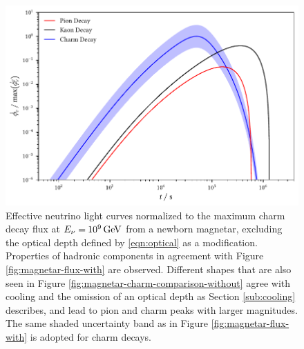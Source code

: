\begin{figure}[H]
	\centering
	\includegraphics{../plots/build/magnetar_neutrino_spectrum_without.pdf}
	\caption[Magnetar $\nu \kern+0.5pt$ flux compared to $c$ decay without optical depth.]
			{Effective neutrino light curves normalized to the maximum charm decay flux at
			 $E_\nu = \kern-0.5pt \qty{e9}{\giga\electronvolt}$ from a newborn magnetar, excluding the optical depth
			 defined by \eqref{eqn:optical} as a modification. Properties of hadronic components in agreement with
			 Figure \ref{fig:magnetar-flux-with} are observed. Different shapes that are also seen in Figure
			 \ref{fig:magnetar-charm-comparison-without} agree with cooling and the omission of an optical depth 
			 as Section \ref{sub:cooling} describes, and lead to pion and charm peaks with larger magnitudes.
			 The same shaded uncertainty band as in Figure \ref{fig:magnetar-flux-with} is adopted for charm decays.}
	\label{fig:magnetar-flux-without}
\end{figure}
